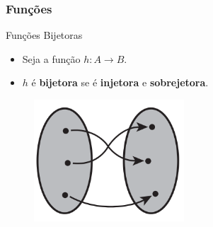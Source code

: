 \documentclass{beamer}
\begin{document}
\begin{frame}
\frametitle{Funções}

	\begin{block}{Funções Bijetoras}
		\begin{itemize}
			\item Seja a função $h: A \to B$.
			\item $h$ é \textbf{bijetora} se é \textbf{injetora} e \textbf{sobrejetora}.
		\end{itemize}
	\end{block}
	
	\begin{figure}[!h]
			\begin{center}
			\includegraphics[width=0.5\textwidth]{Figures/bijetora}
			\end{center}
	\end{figure}	
	
\end{frame}


\end{document}
